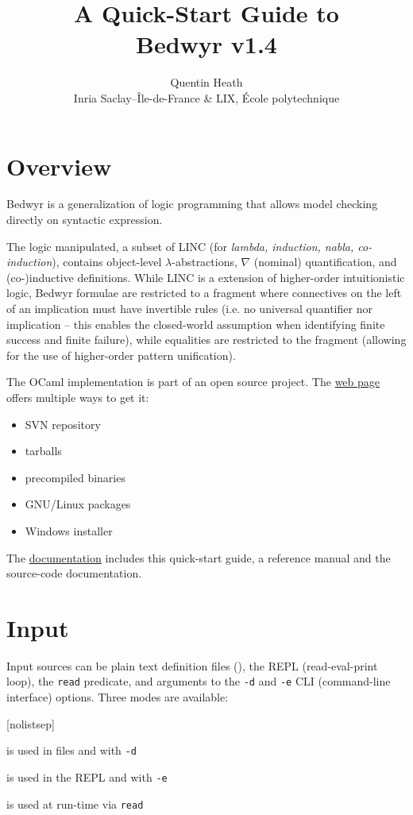\documentclass[a4paper,twocolumn]{article}
\title{{\Huge A Quick-Start Guide to\\Bedwyr v1.4}}
\author{Quentin Heath\\
        Inria Saclay--\^Ile-de-France \& LIX, \'Ecole polytechnique}
\begin{document}
\maketitle

\section{Overview}

Bedwyr is a generalization of logic programming that allows model
checking directly on syntactic expression.

The logic manipulated, a subset of LINC (for \emph{lambda, induction,
nabla, co-induction}), contains object-level $\lambda$-abstractions,
$\nabla$ (nominal) quantification, and (co-)inductive definitions.
While LINC is a extension of higher-order intuitionistic logic, Bedwyr
formulae are restricted to a fragment where connectives on the left of
an implication must have invertible rules (i.e. no universal
quantifier nor implication -- this enables the closed-world assumption
when identifying finite success and finite failure), while equalities
are restricted to the \Ll{} fragment (allowing for the use of
higher-order pattern unification).

The OCaml implementation is part of an open source project.  The
\href{http://slimmer.gforge.inria.fr/bedwyr/#download}{web page}
offers multiple ways to get it:
\begin{itemize}%
[nolistsep]
  \item SVN repository
  \item tarballs
  \item precompiled binaries
  \item GNU/Linux packages
  \item Windows installer
\end{itemize}

The
\href{http://slimmer.gforge.inria.fr/bedwyr/#documentation}{documentation}
includes this quick-start guide, a reference manual and the
source-code documentation.

\section{Input}

Input sources can be plain text definition files (), the
REPL (read-eval-print loop), the \lstinline+read+ predicate, and
arguments to the \texttt{-d} and \texttt{-e} CLI
(command-line interface) options.  Three modes are available:
\begin{description}%
[nolistsep]
  \item[definition mode] is used in  files and with
    \texttt{-d}
  \item[toplevel mode] is used in the REPL and with \texttt{-e}
  \item[term mode] is used at run-time via \lstinline+read+
\end{description}
\end{document}
